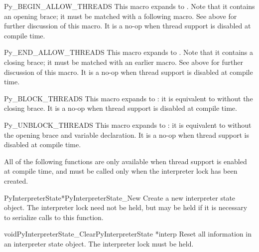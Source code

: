 \begin{csimplemacrodesc}{Py_BEGIN_ALLOW_THREADS}
  This macro expands to
  .
  Note that it contains an opening brace; it must be matched with a
  following  macro.  See above for
  further discussion of this macro.  It is a no-op when thread support
  is disabled at compile time.
\end{csimplemacrodesc}

\begin{csimplemacrodesc}{Py_END_ALLOW_THREADS}
  This macro expands to .
  Note that it contains a closing brace; it must be matched with an
  earlier  macro.  See above for
  further discussion of this macro.  It is a no-op when thread support
  is disabled at compile time.
\end{csimplemacrodesc}

\begin{csimplemacrodesc}{Py_BLOCK_THREADS}
  This macro expands to : it is
  equivalent to  without the
  closing brace.  It is a no-op when thread support is disabled at
  compile time.
\end{csimplemacrodesc}

\begin{csimplemacrodesc}{Py_UNBLOCK_THREADS}
  This macro expands to : it is
  equivalent to  without the
  opening brace and variable declaration.  It is a no-op when thread
  support is disabled at compile time.
\end{csimplemacrodesc}

All of the following functions are only available when thread support
is enabled at compile time, and must be called only when the
interpreter lock has been created.

\begin{cfuncdesc}{PyInterpreterState*}{PyInterpreterState_New}{}
  Create a new interpreter state object.  The interpreter lock need
  not be held, but may be held if it is necessary to serialize calls
  to this function.
\end{cfuncdesc}

\begin{cfuncdesc}{void}{PyInterpreterState_Clear}{PyInterpreterState *interp}
  Reset all information in an interpreter state object.  The
  interpreter lock must be held.
\end{cfuncdesc}


